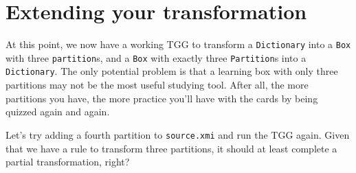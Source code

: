 \newpage
\section{Extending your transformation}
\genHeader

At this point, we now have a working TGG to transform a \texttt{Dictionary} into a \texttt{Box} with three \texttt{partition}s, and a \texttt{Box} with
exactly three \texttt{Partition}s into a \texttt{Dictionary}. The only potential problem is that a learning box with only three partitions may not be the most
useful studying tool. After all, the more partitions you have, the more practice you'll have with the cards by being quizzed again and again.

Let's try adding a fourth partition to \texttt{source.xmi} and run the TGG again. Given that we have a rule to transform three partitions, it should at least
complete a partial transformation, right? 

